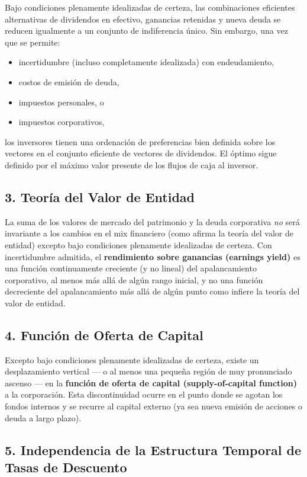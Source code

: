 \documentclass[12pt]{article}
\begin{document}
Bajo condiciones plenamente idealizadas de certeza, las combinaciones eficientes alternativas de dividendos en efectivo, ganancias retenidas y nueva deuda se reducen igualmente a un conjunto de indiferencia \'unico. Sin embargo, una vez que se permite:
\begin{itemize}
  \item incertidumbre (incluso completamente idealizada) con endeudamiento,
  \item costos de emisi\'on de deuda,
  \item impuestos personales, o
  \item impuestos corporativos,
\end{itemize}
los inversores tienen una ordenaci\'on de preferencias bien definida sobre los vectores en el conjunto eficiente de vectores de dividendos. El \'optimo sigue definido por el m\'aximo valor presente de los flujos de caja al inversor.

\subsection*{3. Teor\'ia del Valor de Entidad}

La suma de los valores de mercado del patrimonio y la deuda corporativa \textit{no} ser\'a invariante a los cambios en el mix financiero (como afirma la teor\'ia del valor de entidad) excepto bajo condiciones plenamente idealizadas de certeza. Con incertidumbre admitida, el \textbf{rendimiento sobre ganancias (earnings yield)} es una funci\'on continuamente creciente (y no lineal) del apalancamiento corporativo, al menos m\'as all\'a de alg\'un rango inicial, y no una funci\'on decreciente del apalancamiento m\'as all\'a de alg\'un punto como infiere la teor\'ia del valor de entidad.

\subsection*{4. Funci\'on de Oferta de Capital}

Excepto bajo condiciones plenamente idealizadas de certeza, existe un desplazamiento vertical --- o al menos una peque\~na regi\'on de muy pronunciado ascenso --- en la \textbf{funci\'on de oferta de capital (supply-of-capital function)} a la corporaci\'on. Esta discontinuidad ocurre en el punto donde se agotan los fondos internos y se recurre al capital externo (ya sea nueva emisi\'on de acciones o deuda a largo plazo).

\subsection*{5. Independencia de la Estructura Temporal de Tasas de Descuento}
\end{document}
